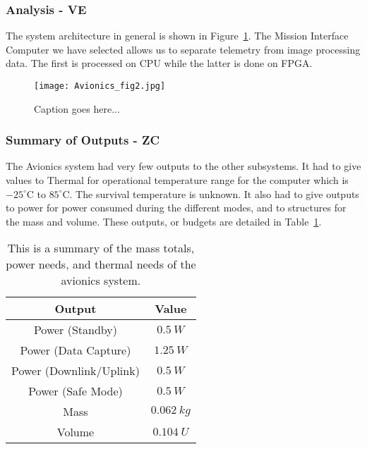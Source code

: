 \documentclass[12pt]{article}
\begin{document}
			\subsubsection{Analysis - VE}
The system architecture in general is shown in Figure~\ref{fig:avionics_architecture}. The Mission Interface Computer we have selected allows us to separate telemetry from image processing data. The first is processed on CPU while the latter is done on FPGA.

\begin{figure}[ht]
\centering
  \texttt{[image: Avionics\_fig2.jpg]}
\caption{Caption goes here...}
\label{fig:avionics_architecture}
\end{figure}

			\subsubsection{Summary of Outputs - ZC}
The Avionics system had very few outputs to the other subsystems. It had to give values to Thermal for operational temperature range for the computer which is $-25^\circ$C to $85^\circ$C. The survival temperature is unknown. It also had to give outputs to power for power consumed during the different modes, and to structures for the mass and volume. These outputs, or budgets are detailed in Table~\ref{table:avionics_summary_outputs}.

\begin{table}[ht]
\caption{This is a summary of the mass totals, power needs, and thermal needs of the avionics system.}
\begin{center}
    \begin{tabular}{|c||c|} \hline
    	Output & Value \\ \hline \hline
    Power (Standby) & $0.5\ W$  \\
    Power (Data Capture) & $1.25\ W$ \\
    Power (Downlink/Uplink) & $0.5\ W$ \\
    Power (Safe Mode) & $0.5\ W$ \\
    Mass & $0.062\ kg$  \\
    Volume & $0.104\ U$ \\ \hline 
    \end{tabular}
\end{center}
\label{table:avionics_summary_outputs}
\end{table}
\end{document}
